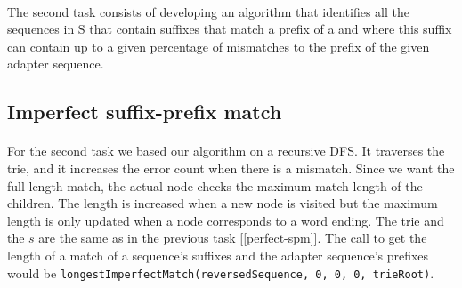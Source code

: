 \documentclass[a4paper,10pt]{article}
\begin{document}
\paragraph{} The second task consists of developing an algorithm that identifies all the sequences in S that contain suffixes that match a prefix of a and where this suffix can contain up to a given percentage of mismatches to the prefix of the given adapter sequence.

\subsection{Imperfect suffix-prefix match} \label{imperfect}

\paragraph{} For the second task we based our algorithm on a recursive DFS. It traverses the trie, and it increases the error count when there is a mismatch.
Since we want the full-length match, the actual node checks the maximum match length of the children.
The length is increased when a new node is visited but the maximum length is only updated when a node corresponds to a word ending.
The trie and the $s$ are the same as in the previous task [\ref{perfect-spm}].
The call to get the length of a match of a sequence's suffixes and the adapter sequence's prefixes would be \texttt{longestImperfectMatch(reversedSequence, 0, 0, 0, trieRoot)}.
\end{document}
